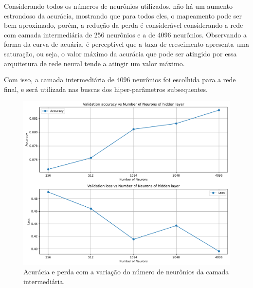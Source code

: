 Considerando todos os números de neurônios utilizados, não há um aumento estrondoso da acurácia, mostrando que para todos eles, o mapeamento pode ser bem aproximado, porém, a redução da perda é considerável considerando a rede com camada intermediária de 256 neurônios e a de 4096 neurônios. Observando a forma da curva de acuária, é perceptível que a taxa de crescimento apresenta uma saturação, ou seja, o valor máximo da acurácia que pode ser atingido por essa arquitetura de rede neural tende a atingir um valor máximo.

Com isso, a camada intermediária de 4096 neurônios foi escolhida para a rede final, e será utilizada nas buscas dos hiper-parâmetros subsequentes.




\begin{figure}[H]
	\centering
	\includegraphics[width=0.75\linewidth]{../../plot/mlp/search_neurons}
	\caption{Acurácia e perda com a variação do número de neurônios da camada intermediária.}
	\label{fig:search_neurons}
\end{figure}

